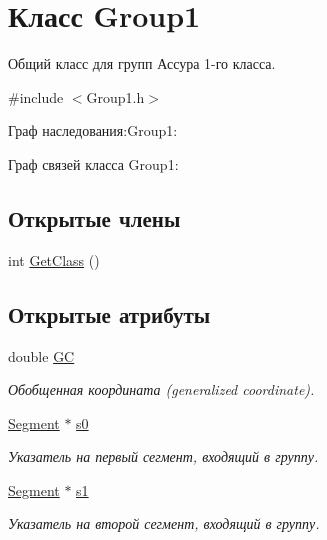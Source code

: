\hypertarget{class_group1}{
\section{Класс Group1}
\label{class_group1}
}


Общий класс для групп Ассура 1-\/го класса.  




{\ttfamily \#include $<$Group1.h$>$}



Граф наследования:Group1:


Граф связей класса Group1:
\subsection*{Открытые члены}
\begin{DoxyCompactItemize}
\item 
int \hyperlink{class_group1_ae140ac370f27e075217a2f3423e5b07a}{GetClass} ()
\end{DoxyCompactItemize}
\subsection*{Открытые атрибуты}
\begin{DoxyCompactItemize}
\item 
\hypertarget{class_group1_abc21caefa9eda865a472434188d3947b}{
double \hyperlink{class_group1_abc21caefa9eda865a472434188d3947b}{GC}}
\label{class_group1_abc21caefa9eda865a472434188d3947b}

\begin{DoxyCompactList}\small\item\em Обобщенная координата (generalized coordinate). \item\end{DoxyCompactList}\item 
\hypertarget{class_group1_a769c658c59d6045b6af2a6ba1d920660}{
\hyperlink{class_segment}{Segment} $\ast$ \hyperlink{class_group1_a769c658c59d6045b6af2a6ba1d920660}{s0}}
\label{class_group1_a769c658c59d6045b6af2a6ba1d920660}

\begin{DoxyCompactList}\small\item\em Указатель на первый сегмент, входящий в группу. \item\end{DoxyCompactList}\item 
\hypertarget{class_group1_acf0f92405ee52288a65b0ec48d523c74}{
\hyperlink{class_segment}{Segment} $\ast$ \hyperlink{class_group1_acf0f92405ee52288a65b0ec48d523c74}{s1}}
\label{class_group1_acf0f92405ee52288a65b0ec48d523c74}

\begin{DoxyCompactList}\small\item\em Указатель на второй сегмент, входящий в группу. \item\end{DoxyCompactList}\end{DoxyCompactItemize}


